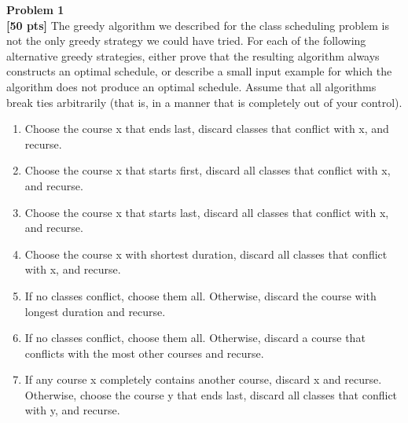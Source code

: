 \documentclass{article}
\newenvironment{problem}[2][Problem]
    { \begin{mdframed}[backgroundcolor=gray!20] \textbf{#1 #2} \\}
    {  \end{mdframed}}
\begin{document}
\begin{problem}{1}
\textbf{[50 pts]}
The greedy algorithm we described for the class scheduling problem is not the only greedy strategy we could have tried. For each of the following alternative greedy strategies, either prove that the resulting algorithm always constructs an optimal schedule, or describe a small input example for which the algorithm does not produce an optimal schedule. Assume that all algorithms break ties arbitrarily (that is, in a manner that is completely out of your control).
\begin{enumerate}
	\item Choose the course x that ends last, discard classes that conflict with x, and recurse.
	\item Choose the course x that starts first, discard all classes that conflict with x, and recurse.
	\item Choose the course x that starts last, discard all classes that conflict with x, and recurse.
	\item Choose the course x with shortest duration, discard all classes that conflict with x, and recurse.
	\item If no classes conflict, choose them all. Otherwise, discard the course with longest duration and recurse.
	\item If no classes conflict, choose them all. Otherwise, discard a course that conflicts with the most other courses and recurse.
	\item If any course x completely contains another course, discard x and recurse. Otherwise, choose the course y that ends last, discard all classes that conflict with y, and recurse.
\end{enumerate}
\end{problem}
\end{document}
